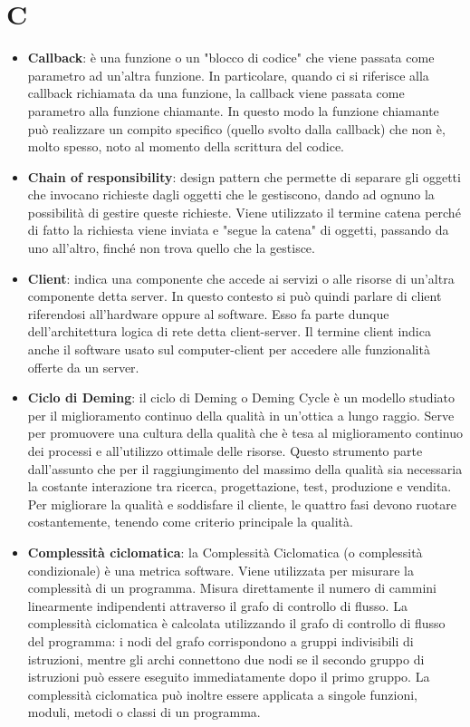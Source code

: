 \section{C}
\begin{itemize}
\item
	\textbf{Callback}: è una funzione o un "blocco di codice" che viene passata come parametro ad un'altra funzione. In particolare, quando ci si riferisce alla callback richiamata da una funzione, la callback viene passata come parametro alla funzione chiamante. In questo modo la funzione chiamante può realizzare un compito specifico (quello svolto dalla callback) che non è, molto spesso, noto al momento della scrittura del codice.
	\item
	\textbf{Chain of responsibility}: design pattern che permette di separare gli oggetti che invocano richieste dagli oggetti che le gestiscono, dando ad ognuno la possibilità di gestire queste richieste. Viene utilizzato il termine catena perché di fatto la richiesta viene inviata e "segue la catena" di oggetti, passando da uno all'altro, finché non trova quello che la gestisce.
	\item
	\textbf{Client}: indica una componente che accede ai servizi o alle risorse di un'altra componente detta server. In questo contesto si può quindi parlare di client riferendosi all'hardware oppure al software. Esso fa parte dunque dell'architettura logica di rete detta client-server.
	Il termine client indica anche il software usato sul computer-client per accedere alle funzionalità offerte da un server.
	\item
	\textbf{Ciclo di Deming}: il ciclo di Deming o Deming Cycle è un modello studiato per il miglioramento continuo della qualità in un'ottica a lungo raggio. Serve per promuovere una cultura della qualità che è tesa al miglioramento continuo dei processi e all'utilizzo ottimale delle risorse. Questo strumento parte dall'assunto che per il raggiungimento del massimo della qualità sia necessaria la costante interazione tra ricerca, progettazione, test, produzione e vendita. Per migliorare la qualità e soddisfare il cliente, le quattro fasi devono ruotare costantemente, tenendo come criterio principale la qualità.
	\item
	\textbf{Complessità ciclomatica}: la Complessità Ciclomatica (o complessità condizionale) è una metrica software. Viene utilizzata per misurare la complessità di un programma. Misura direttamente il numero di cammini linearmente indipendenti attraverso il grafo di controllo di flusso. La complessità ciclomatica è calcolata utilizzando il grafo di controllo di flusso del programma: i nodi del grafo corrispondono a gruppi indivisibili di istruzioni, mentre gli archi connettono due nodi se il secondo gruppo di istruzioni può essere eseguito immediatamente dopo il primo gruppo. La complessità ciclomatica può inoltre essere applicata a singole funzioni, moduli, metodi o classi di un programma.

\end{itemize}
